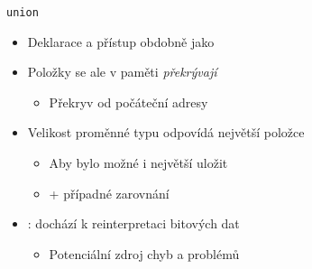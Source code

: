 \begin{frame}{\texttt{union}}

  \begin{itemize}
    \item Deklarace a přístup obdobně jako 

    \pause

    \item Položky se ale v paměti \emph{překrývají}
    \begin{itemize}
      \item Překryv od počáteční adresy
    \end{itemize}

    \pause

    \item Velikost proměnné typu  odpovídá největší položce
    \begin{itemize}
      \item Aby bylo možné i největší uložit

      \pause

      \item + případné zarovnání
    \end{itemize}

    \pause

    \item \pozor: dochází k reinterpretaci bitových dat
    \begin{itemize}
      \item Potenciální zdroj chyb a problémů
    \end{itemize}

%
  \end{itemize}

\end{frame}

